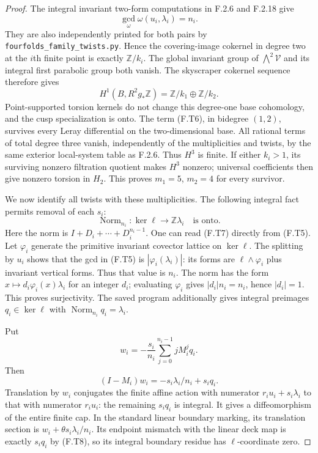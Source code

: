 \begin{proof}
The integral invariant two-form computations in F.2.6 and
F.2.18 give
\[
 \gcd_{\omega}\omega(u_i,\lambda_i)=n_i.
 \tag{F.T5}
\]
They are also independently printed for both pairs by
\texttt{fourfolds\_family\_twists.py}.
Hence the covering-image cokernel in degree two at the
$i$th finite point is exactly $\mathbb Z/k_i$.
The global invariant group of $\bigwedge^2\mathcal V$
and its integral first parabolic group both vanish.
The skyscraper cokernel sequence therefore gives
\[
 H^1(B,R^2g_*\mathbb Z)
       =\mathbb Z/k_1\oplus\mathbb Z/k_2.
 \tag{F.T6}
\]
Point-supported torsion kernels do not change this degree-one
base cohomology, and the cusp specialization is onto.
The term (F.T6), in bidegree $(1,2)$, survives every Leray
differential on the two-dimensional base.
All rational terms of total degree three vanish, independently
of the multiplicities and twists, by the same exterior
local-system table as F.2.6.  Thus $H^3$ is finite.
If either $k_i>1$, its surviving nonzero filtration quotient
makes $H^3$ nonzero; universal coefficients then give
nonzero torsion in $H_2$.
This proves $m_1=5$, $m_2=4$ for every survivor.

We now identify all twists with these multiplicities.
The following integral fact permits removal of each $s_i$:
\[
 \operatorname{Norm}_{n_i}:
 \ker\ell\longrightarrow\mathbb Z\lambda_i
 \quad\text{is onto}.
 \tag{F.T7}
\]
Here the norm is $I+D_i+\cdots+D_i^{n_i-1}$.
One can read (F.T7) directly from (F.T5).
Let $\varphi_i$ generate the primitive invariant covector
lattice on $\ker\ell$.
The splitting by $u_i$ shows that the gcd in (F.T5) is
$|\varphi_i(\lambda_i)|$: its forms are
$\ell\wedge\varphi_i$ plus invariant vertical forms.
Thus that value is $n_i$.
The norm has the form
$x\mapsto d_i\varphi_i(x)\lambda_i$ for an integer
$d_i$; evaluating $\varphi_i$ gives
$|d_i|n_i=n_i$, hence $|d_i|=1$.
This proves surjectivity.  The saved program additionally
gives integral preimages $q_i\in\ker\ell$ with
$\operatorname{Norm}_{n_i}q_i=\lambda_i$.

Put
\[
 w_i=-\frac{s_i}{n_i}\sum_{j=0}^{n_i-1}jM_i^j q_i.
\]
Then
\[
 (I-M_i)w_i=-s_i\lambda_i/n_i+s_iq_i.
 \tag{F.T8}
\]
Translation by $w_i$ conjugates the finite affine action
with numerator $r_i u_i+s_i\lambda_i$ to that with
numerator $r_i u_i$: the remaining $s_iq_i$ is integral.
It gives a diffeomorphism of the entire finite cap.
In the standard linear boundary marking, its translation
section is
$w_i+\theta s_i\lambda_i/n_i$.
Its endpoint mismatch with the linear deck map is exactly
$s_iq_i$ by (F.T8), so its integral boundary residue has
$\ell$-coordinate zero.


\end{proof}
